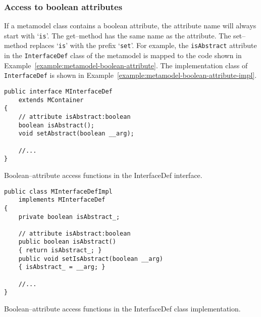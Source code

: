 \subsubsection{Access to boolean attributes}

If a metamodel class contains a boolean attribute, the attribute name will
always start with `{\tt is}'. The get--method has the same name as the
attribute. The set--method replaces `{\tt is}' with the prefix `{\tt set}'. For
example, the {\tt isAbstract} attribute in the {\tt InterfaceDef} class of the
metamodel is mapped to the code shown in
Example~\ref{example:metamodel-boolean-attribute}. The implementation class of
{\tt InterfaceDef} is shown in
Example~\ref{example:metamodel-boolean-attribute-impl}.

\begin{Example}
\begin{minifbox}
\begin{verbatim}
public interface MInterfaceDef
    extends MContainer
{
    // attribute isAbstract:boolean
    boolean isAbstract();
    void setAbstract(boolean __arg);

    //...
}
\end{verbatim}
\end{minifbox}
\caption{Boolean--attribute access functions in the InterfaceDef interface.}
\label{example:metamodel-boolean-attribute}
\end{Example}

\begin{Example}
\begin{minifbox}
\begin{verbatim}
public class MInterfaceDefImpl
    implements MInterfaceDef
{
    private boolean isAbstract_;

    // attribute isAbstract:boolean
    public boolean isAbstract()
    { return isAbstract_; }
    public void setIsAbstract(boolean __arg)
    { isAbstract_ = __arg; }

    //...
}
\end{verbatim}
\end{minifbox}
\caption{Boolean--attribute access functions in the InterfaceDef class
implementation.}
\label{example:metamodel-boolean-attribute-impl}
\end{Example}


